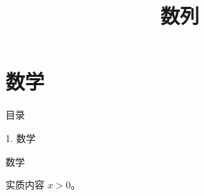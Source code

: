 \documentclass[aspectratio=169,10pt,fontset=fandol]{ctexbeamer}
\title{数列}
\begin{document}
\section{数学}
\begin{frame}[t,fragile]{目录}
\normalsize
{\color{blue}\normalsize 1. 数学\par}\vspace{0.3em}
\end{frame}
\begin{frame}[t,fragile]{数学}
\normalsize
{\normalsize
实质内容 $x>0$。


}
\end{frame}
\end{document}
